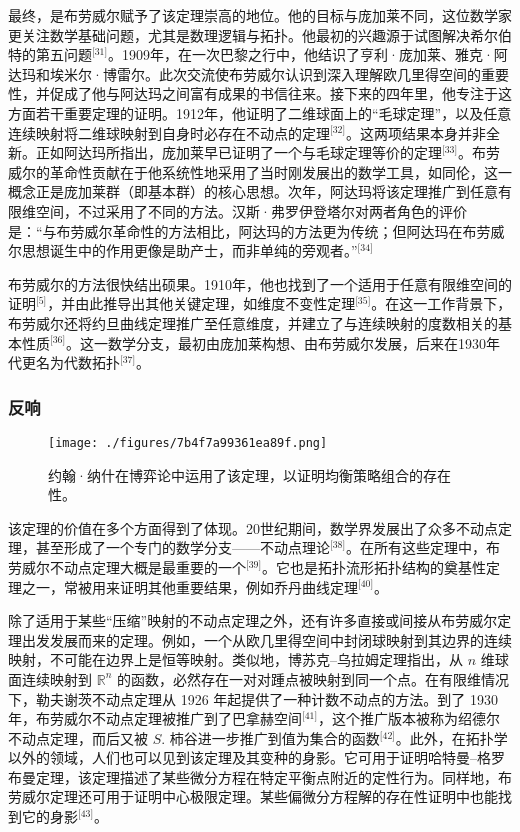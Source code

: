 最终，是布劳威尔赋予了该定理崇高的地位。他的目标与庞加莱不同，这位数学家更关注数学基础问题，尤其是数理逻辑与拓扑。他最初的兴趣源于试图解决希尔伯特的第五问题\(^\text{[31]}\)。1909年，在一次巴黎之行中，他结识了亨利·庞加莱、雅克·阿达玛和埃米尔·博雷尔。此次交流使布劳威尔认识到深入理解欧几里得空间的重要性，并促成了他与阿达玛之间富有成果的书信往来。接下来的四年里，他专注于这方面若干重要定理的证明。1912年，他证明了二维球面上的“毛球定理”，以及任意连续映射将二维球映射到自身时必存在不动点的定理\(^\text{[32]}\)。这两项结果本身并非全新。正如阿达玛所指出，庞加莱早已证明了一个与毛球定理等价的定理\(^\text{[33]}\)。布劳威尔的革命性贡献在于他系统性地采用了当时刚发展出的数学工具，如同伦，这一概念正是庞加莱群（即基本群）的核心思想。次年，阿达玛将该定理推广到任意有限维空间，不过采用了不同的方法。汉斯·弗罗伊登塔尔对两者角色的评价是：“与布劳威尔革命性的方法相比，阿达玛的方法更为传统；但阿达玛在布劳威尔思想诞生中的作用更像是助产士，而非单纯的旁观者。”\(^\text{[34]}\)

布劳威尔的方法很快结出硕果。1910年，他也找到了一个适用于任意有限维空间的证明\(^\text{[5]}\)，并由此推导出其他关键定理，如维度不变性定理\(^\text{[35]}\)。在这一工作背景下，布劳威尔还将约旦曲线定理推广至任意维度，并建立了与连续映射的度数相关的基本性质\(^\text{[36]}\)。这一数学分支，最初由庞加莱构想、由布劳威尔发展，后来在1930年代更名为代数拓扑\(^\text{[37]}\)。
\subsubsection{反响}
\begin{figure}[ht]
\centering
\texttt{[image: ./figures/7b4f7a99361ea89f.png]}
\caption{约翰·纳什在博弈论中运用了该定理，以证明均衡策略组合的存在性。} \label{fig_BLWRbd_4}
\end{figure}
该定理的价值在多个方面得到了体现。20世纪期间，数学界发展出了众多不动点定理，甚至形成了一个专门的数学分支——不动点理论\(^\text{[38]}\)。在所有这些定理中，布劳威尔不动点定理大概是最重要的一个\(^\text{[39]}\)。它也是拓扑流形拓扑结构的奠基性定理之一，常被用来证明其他重要结果，例如乔丹曲线定理\(^\text{[40]}\)。

除了适用于某些“压缩”映射的不动点定理之外，还有许多直接或间接从布劳威尔定理出发发展而来的定理。例如，一个从欧几里得空间中封闭球映射到其边界的连续映射，不可能在边界上是恒等映射。类似地，博苏克–乌拉姆定理指出，从 $n$ 维球面连续映射到 $\mathbb{R}^n$ 的函数，必然存在一对对踵点被映射到同一个点。在有限维情况下，勒夫谢茨不动点定理从 1926 年起提供了一种计数不动点的方法。到了 1930 年，布劳威尔不动点定理被推广到了巴拿赫空间\(^\text{[41]}\)，这个推广版本被称为绍德尔不动点定理，而后又被 $S$. 柿谷进一步推广到值为集合的函数\(^\text{[42]}\)。此外，在拓扑学以外的领域，人们也可以见到该定理及其变种的身影。它可用于证明哈特曼–格罗布曼定理，该定理描述了某些微分方程在特定平衡点附近的定性行为。同样地，布劳威尔定理还可用于证明中心极限定理。某些偏微分方程解的存在性证明中也能找到它的身影\(^\text{[43]}\)。

